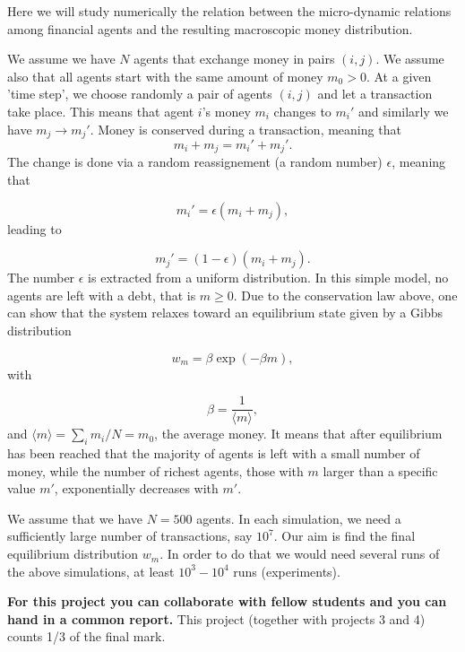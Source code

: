\documentclass[%
oneside,                 %
final,                   %
10pt]{article}
\begin{document}
Here we will study numerically the relation between the micro-dynamic relations among financial 
agents and the  resulting macroscopic money distribution.

We assume we have $N$ agents that exchange money in pairs $(i,j)$. We assume also that all agents
start with the same amount of money $m_0 > 0$. At a given 'time step', we choose randomly a pair
of agents $(i,j)$ and let a transaction take place. This means that agent $i$'s money $m_i$ changes
to $m_i'$ and similarly we have $m_j\rightarrow m_j'$. 
Money is conserved during a transaction, meaning that
\begin{equation}
  m_i+m_j=m_i'+m_j'.
  \label{eq:conserve}
\end{equation}
The change is done via a random reassignement (a random number) $\epsilon$, meaning that

\begin{equation*}
m_i' = \epsilon(m_i+m_j),
\end{equation*}
leading to

\begin{equation*}
m_j'= (1-\epsilon)(m_i+m_j).
\end{equation*}
The number $\epsilon$ is extracted from a uniform distribution.
In this simple model, no agents are left with a debt, that is $m\ge 0$.
Due to the conservation law above, one can show that the system relaxes toward an equilibrium
state given by a Gibbs distribution

\begin{equation*}
w_m=\beta \exp{(-\beta m)},
\end{equation*}
with

\begin{equation*}
\beta = \frac{1}{\langle m\rangle},
\end{equation*}
and $\langle m\rangle=\sum_i m_i/N=m_0$, the average money.
It means that after equilibrium has been reached that the majority of agents is left with a small
number of money, while the number of richest agents, those with $m$ larger than a specific value $m'$,
exponentially decreases with $m'$.

We assume that we have $N=500$ agents.   In each simulation, we need a sufficiently large number of transactions, say $10^7$. Our aim is find the final equilibrium distribution $w_m$. In order to do that we would need
several runs of the above simulations, at least $10^3-10^4$ runs (experiments).




\textbf{For this project you can collaborate with fellow students and you can  hand in a common report.}
This project (together with projects 3 and 4) counts 1/3 of the final mark.
\end{document}

